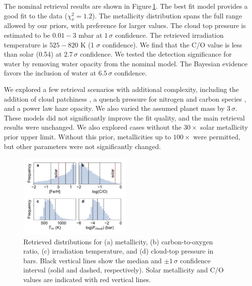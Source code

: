 \documentclass[twocolumn, trackchanges]{aastex61}
\begin{document}

The nominal retrieval results are shown in Figure\,\ref{fig:retrieval}.  The best fit model provides a good fit to the data ($\chi^2_\nu = 1.2$).  The metallicity distribution spans the full range allowed by our priors, with preference for larger values. The cloud top pressure is estimated to be $0.01 - 3$ mbar at $1\,\sigma$ confidence. The retrieved irradiation temperature is $525 - 820$ K (1 $\sigma$ confidence).  We find that the C/O value is less than solar (0.54) at $2.7\,\sigma$ confidence.  We tested the detection significance for water by removing water opacity from the nominal model. The Bayesian evidence favors the inclusion of water at $6.5\,\sigma$ confidence. 

We explored a few retrieval scenarios with additional complexity, including the addition of cloud patchiness \citep{line16}, a quench pressure for nitrogen and carbon species \citep[e.g.][]{morley17}, and a power law haze opacity.  We also varied the assumed planet mass by $3\,\sigma$. These models did not significantly improve the fit quality, and the main retrieval results were unchanged.  We also explored cases without the $30\times$ solar metallicity prior upper limit. Without this prior, metallicities up to $100\times$ were permitted, but other parameters were not significantly changed. 

\begin{figure}
\includegraphics[width = 0.5\textwidth]{fig4_retrieval.pdf}
\caption{Retrieved distributions for (a) metallicity, (b) carbon-to-oxygen ratio, (c) irradiation temperature, and (d) cloud-top pressure in bars. Black vertical lines show the median and $\pm1\,\sigma$ confidence interval (solid and dashed, respectively). Solar metallicity and C/O values are indicated with red vertical lines.}  \label{fig:retrieval}
\end{figure}
\end{document}
